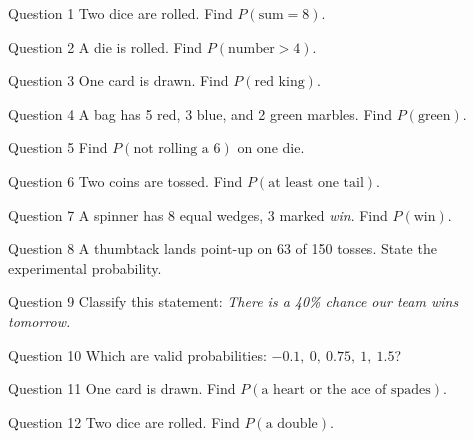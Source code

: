 \documentclass[11pt]{article}
\begin{document}
\begin{qbox}{Question 1}
Two dice are rolled. Find $P(\text{sum}=8)$.\workspace{2.4cm}
\end{qbox}

\begin{qbox}{Question 2}
A die is rolled. Find $P(\text{number}>4)$.\workspace{2.4cm}
\end{qbox}

\begin{qbox}{Question 3}
One card is drawn. Find $P(\text{red king})$.\workspace{2.4cm}
\end{qbox}

\begin{qbox}{Question 4}
A bag has 5 red, 3 blue, and 2 green marbles. Find $P(\text{green})$.\workspace{2.4cm}
\end{qbox}

\begin{qbox}{Question 5}
Find $P(\text{not rolling a 6})$ on one die.\workspace{2.4cm}
\end{qbox}

\begin{qbox}{Question 6}
Two coins are tossed. Find $P(\text{at least one tail})$.\workspace{2.4cm}
\end{qbox}

\begin{qbox}{Question 7}
A spinner has 8 equal wedges, 3 marked \emph{win}. Find $P(\text{win})$.\workspace{2.4cm}
\end{qbox}

\begin{qbox}{Question 8}
A thumbtack lands point-up on 63 of 150 tosses. State the experimental probability.\workspace{2.4cm}
\end{qbox}

\begin{qbox}{Question 9}
Classify this statement: \emph{There is a 40\% chance our team wins tomorrow.}\workspace{2.4cm}
\end{qbox}

\begin{qbox}{Question 10}
Which are valid probabilities: $-0.1,\ 0,\ 0.75,\ 1,\ 1.5$?\workspace{2.4cm}
\end{qbox}

\begin{qbox}{Question 11}
One card is drawn. Find $P(\text{a heart or the ace of spades})$.\workspace{2.4cm}
\end{qbox}

\begin{qbox}{Question 12}
Two dice are rolled. Find $P(\text{a double})$.\workspace{2.4cm}
\end{qbox}
\end{document}
